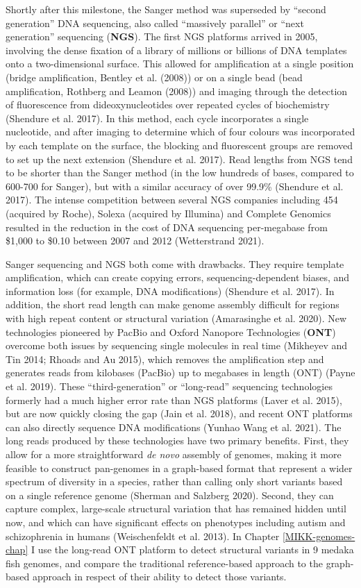 \documentclass[
]{book}
\begin{document}
Shortly after this milestone, the Sanger method was superseded by ``second generation'' DNA sequencing, also called ``massively parallel'' or ``next generation'' sequencing (\textbf{NGS}). The first NGS platforms arrived in 2005, involving the dense fixation of a library of millions or billions of DNA templates onto a two-dimensional surface. This allowed for amplification at a single position (bridge amplification, Bentley et al. (2008)) or on a single bead (bead amplification, Rothberg and Leamon (2008)) and imaging through the detection of fluorescence from dideoxynucleotides over repeated cycles of biochemistry (Shendure et al. 2017). In this method, each cycle incorporates a single nucleotide, and after imaging to determine which of four colours was incorporated by each template on the surface, the blocking and fluorescent groups are removed to set up the next extension (Shendure et al. 2017). Read lengths from NGS tend to be shorter than the Sanger method (in the low hundreds of bases, compared to 600-700 for Sanger), but with a similar accuracy of over 99.9\% (Shendure et al. 2017). The intense competition between several NGS companies including 454 (acquired by Roche), Solexa (acquired by Illumina) and Complete Genomics resulted in the reduction in the cost of DNA sequencing per-megabase from \$1,000 to \$0.10 between 2007 and 2012 (Wetterstrand 2021).

Sanger sequencing and NGS both come with drawbacks. They require template amplification, which can create copying errors, sequencing-dependent biases, and information loss (for example, DNA modifications) (Shendure et al. 2017). In addition, the short read length can make genome assembly difficult for regions with high repeat content or structural variation (Amarasinghe et al. 2020). New technologies pioneered by PacBio and Oxford Nanopore Technologies (\textbf{ONT}) overcome both issues by sequencing single molecules in real time (Mikheyev and Tin 2014; Rhoads and Au 2015), which removes the amplification step and generates reads from kilobases (PacBio) up to megabases in length (ONT) (Payne et al. 2019). These ``third-generation'' or ``long-read'' sequencing technologies formerly had a much higher error rate than NGS platforms (Laver et al. 2015), but are now quickly closing the gap (Jain et al. 2018), and recent ONT platforms can also directly sequence DNA modifications (Yunhao Wang et al. 2021). The long reads produced by these technologies have two primary benefits. First, they allow for a more straightforward \emph{de novo} assembly of genomes, making it more feasible to construct pan-genomes in a graph-based format that represent a wider spectrum of diversity in a species, rather than calling only short variants based on a single reference genome (Sherman and Salzberg 2020). Second, they can capture complex, large-scale structural variation that has remained hidden until now, and which can have significant effects on phenotypes including autism and schizophrenia in humans (Weischenfeldt et al. 2013). In Chapter \ref{MIKK-genomes-chap} I use the long-read ONT platform to detect structural variants in 9 medaka fish genomes, and compare the traditional reference-based approach to the graph-based approach in respect of their ability to detect those variants.
\end{document}
